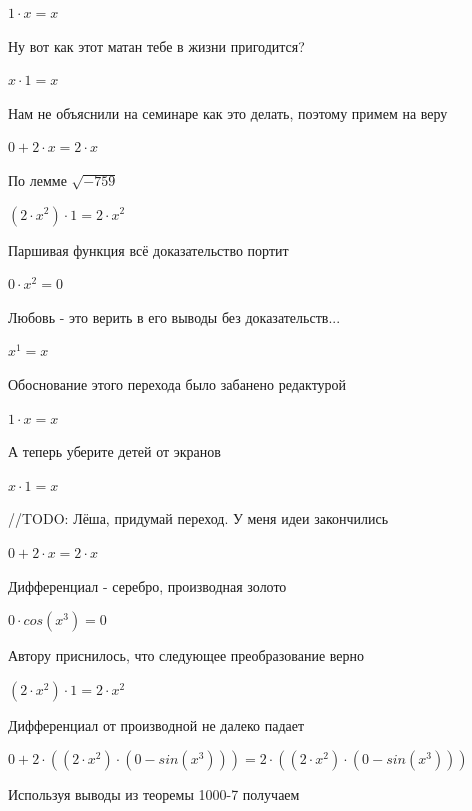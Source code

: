 \documentclass[12pt,a4paper,fleqn]{article}
\begin{document}
\begin{center}
$1 \cdot x = x$\end{center}
Ну вот как этот матан тебе в жизни пригодится?

\begin{center}
$x \cdot 1 = x$\end{center}
Нам не объяснили на семинаре как это делать, поэтому примем на веру

\begin{center}
$0+2 \cdot x = 2 \cdot x$\end{center}
По лемме $\sqrt{-759}$
\begin{center}
$(2 \cdot x^{2}) \cdot 1 = 2 \cdot x^{2}$\end{center}
Паршивая функция всё доказательство портит\cite{link2}

\begin{center}
$0 \cdot x^{2} = 0$\end{center}
Любовь - это верить в его выводы без доказательств...

\begin{center}
$x^{1} = x$\end{center}
Обоснование этого перехода было забанено редактурой

\begin{center}
$1 \cdot x = x$\end{center}
А теперь уберите детей от экранов

\begin{center}
$x \cdot 1 = x$\end{center}
//TODO: Лёша, придумай переход. У меня идеи закончились

\begin{center}
$0+2 \cdot x = 2 \cdot x$\end{center}
Дифференциал - серебро, производная золото\cite{link2}

\begin{center}
$0 \cdot cos(x^{3}) = 0$\end{center}
Автору приснилось, что следующее преобразование верно

\begin{center}
$(2 \cdot x^{2}) \cdot 1 = 2 \cdot x^{2}$\end{center}
Дифференциал от производной не далеко падает\cite{link2}

\begin{center}
$0+2 \cdot ((2 \cdot x^{2}) \cdot (0-sin(x^{3}))) = 2 \cdot ((2 \cdot x^{2}) \cdot (0-sin(x^{3})))$\end{center}
Используя выводы из теоремы 1000-7 получаем
\end{document}
